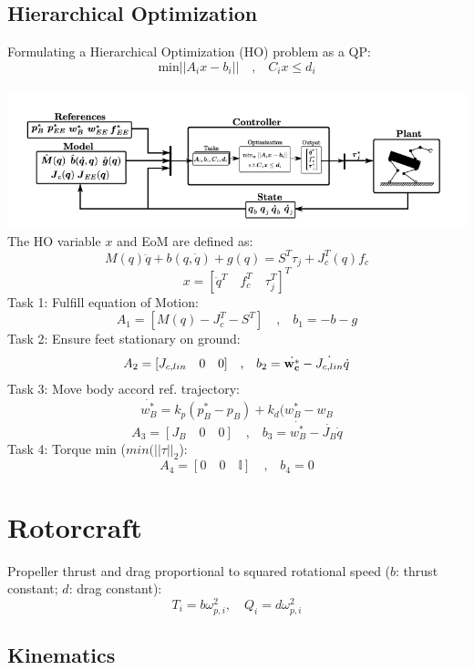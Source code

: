 \documentclass[a4paper, 8pt]{extarticle}
\begin{document}
\begin{multicols*}{3}
\subsection{Hierarchical Optimization}
Formulating a Hierarchical Optimization (HO) problem as a QP:
$$ \textrm{min}||A_{i}x-b_{i}||\quad \textrm{,} \quad C_{i}x\leq d_{i}$$\\
\includegraphics[width=1\linewidth]{images/Control_Legged.PNG}\\
The HO variable $x$ and EoM are defined as:
$$ M(q)\ddot{q}+b(q,\dot{q})+g(q)=S^{T}\tau_{j}+J_{c}^T(q)f_{c}$$
$$x= [\ddot{q}^T \quad f_{c}^T \quad \tau_{j}^T ]^T$$
Task 1: Fulfill equation of Motion:
$$ A_{1}=[M(q) -J_{c}^T -S^T] \quad \textrm{,} \quad b_{1}=-b-g$$
Task 2: Ensure feet stationary on ground:
$$ A_{2}=[J_{c,lin} \quad 0 \quad 0] \quad \textrm{,} \quad b_{2}=\dot{\bf w_{c}^*}-\dot{J_{c,lin}}\dot{q}$$
Task 3: Move body accord ref. trajectory:
$$ \dot{ w_{B}^*}=k_{p}(p_{B}^*-p_{B})+k_{d}(w_{B}^*-w_{B} $$
$$ A_{3}=[J_{B} \quad 0 \quad 0] \quad \textrm{,} \quad b_{3}=\dot{w_{B}^*}-\dot{J_{B}}\dot{q} $$
Task 4: Torque min ($min(||\tau||_{2}$):
$$ A_{4}=[0 \quad 0 \quad \mathbb{I}] \quad \textrm{,} \quad b_{4}=0 $$
\section{Rotorcraft}

Propeller thrust and drag proportional to squared rotational speed ($b$: thrust constant; $d$: drag constant):
$$T_i = b\omega_{p,i}^2, \quad Q_i = d\omega_{p,i}^2$$


\subsection{Kinematics}


\end{multicols*}
\end{document}
